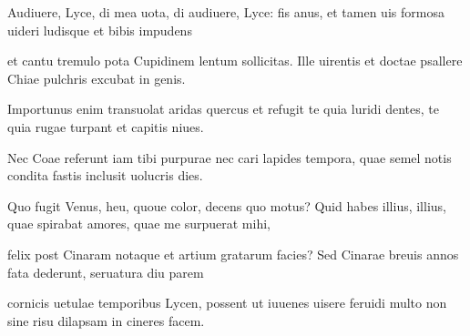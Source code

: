 \documentclass{book}
\newenvironment {carmen} [1] [\relax] 
  {\Titulus \Versus \incipit*\numerus{1}#1}
  {\endVersus}
\newcommand {\AsclB}     {\Forma \strophae {0 \poena 02 \poena 3}}
\begin{document}
\begin{carmen}[\AsclB]


Audiuere, Lyce, di mea uota, di
 audiuere, Lyce: fis anus, et tamen
      uis formosa uideri
      ludisque et bibis impudens
 
et cantu tremulo pota Cupidinem               
 lentum sollicitas. Ille uirentis et
      doctae psallere Chiae
      pulchris excubat in genis.
 
Importunus enim transuolat aridas
 quercus et refugit te quia luridi               
      dentes, te quia rugae
      turpant et capitis niues.
 
Nec Coae referunt iam tibi purpurae
 nec cari lapides tempora, quae semel
      notis condita fastis               
      inclusit uolucris dies.
 
Quo fugit Venus, heu, quoue color, decens
 quo motus? Quid habes illius, illius,
      quae spirabat amores,
      quae me surpuerat mihi,               
 
felix post Cinaram notaque et artium
 gratarum facies? Sed Cinarae breuis
      annos fata dederunt,
      seruatura diu parem
 
cornicis uetulae temporibus Lycen,                
possent ut iuuenes uisere feruidi
      multo non sine risu
      dilapsam in cineres facem.
 

\end{carmen}
\end{document}
